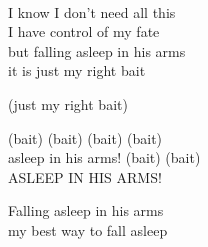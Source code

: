 \begin{lyrics}
\\
I know I don't need all this\\
I have control of my fate\\
but falling asleep in his arms\\
it is just my right bait

(just my right bait)

(bait) (bait) (bait) (bait)\\
asleep in his arms! (bait) (bait)\\
ASLEEP IN HIS ARMS!

Falling asleep in his arms\\
my best way to fall asleep
\end{lyrics}
